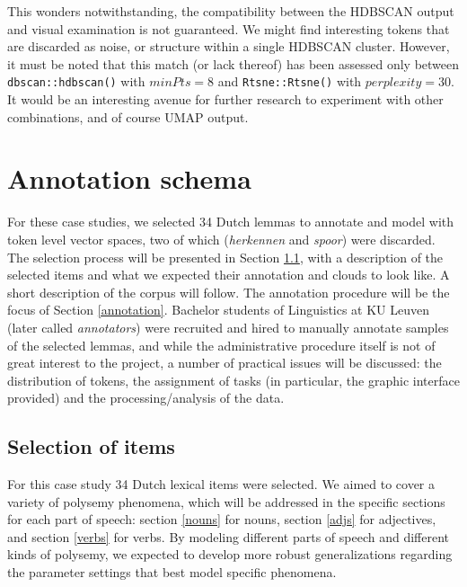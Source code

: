 \documentclass[
]{book}
\begin{document}
This wonders notwithstanding, the compatibility between the HDBSCAN output and visual examination is not guaranteed. We might find interesting tokens that are discarded as noise, or structure within
a single HDBSCAN cluster. However, it must be noted that this match (or lack thereof)
has been assessed only between \texttt{dbscan::hdbscan()} with \(minPts = 8\) and
\texttt{Rtsne::Rtsne()} with \(perplexity = 30\). It would be an interesting avenue for further research to experiment with other combinations, and of course UMAP output.

\hypertarget{ann}{%
\chapter{Annotation schema}\label{ann}}

For these case studies, we selected 34 Dutch lemmas to annotate and model with token level vector spaces, two of which (\emph{herkennen} and \emph{spoor}) were discarded.
The selection process will be presented in Section \ref{selection}, with a description of the selected items and what we expected their annotation and clouds to look like. A short description of the corpus \autocite[QLVLNewsCorpus,][]{depascale_2019} will follow. The annotation procedure will be the focus of Section \ref{annotation}.
Bachelor students of Linguistics at KU Leuven (later called \emph{annotators}) were recruited and hired to manually annotate samples of the selected lemmas, and while the administrative procedure itself is not of great interest to the project, a number of practical issues will be discussed: the distribution of tokens, the assignment of tasks (in particular, the graphic interface provided) and the processing/analysis of the data.

\hypertarget{selection}{%
\section{Selection of items}\label{selection}}

For this case study 34 Dutch lexical items were selected. We aimed to cover a variety of polysemy phenomena, which will be addressed in the specific sections for each part of speech: section \ref{nouns} for nouns, section \ref{adjs} for adjectives, and section \ref{verbs} for verbs.
By modeling different parts of speech and different kinds of polysemy, we expected to develop more robust generalizations regarding the parameter settings that best model specific phenomena.
\end{document}
